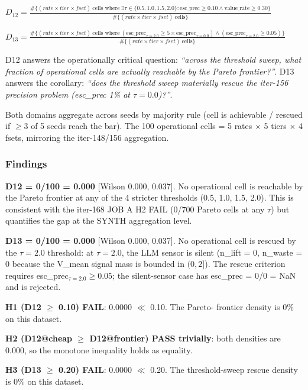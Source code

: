 \documentclass{article}
\begin{document}
  $D_{12} = \frac{\#\{(rate \times tier \times fset)\ \text{cells where}\ \exists \tau \in \{0.5, 1.0, 1.5, 2.0\} : \text{esc\_prec} \geq 0.10 \wedge \text{value\_rate} \geq 0.30\}}{\#\{(rate \times tier \times fset)\ \text{cells}\}}$

  $D_{13} = \frac{\#\{(rate \times tier \times fset)\ \text{cells where}\ (\text{esc\_prec}_{\tau=2.0} \geq 5 \times \text{esc\_prec}_{\tau=0.0}) \wedge (\text{esc\_prec}_{\tau=2.0} \geq 0.05)\}}{\#\{(rate \times tier \times fset)\ \text{cells}\}}$

D12 answers the operationally critical question: \emph{``across the
threshold sweep, what fraction of operational cells are actually
reachable by the Pareto frontier?''}. D13 answers the corollary:
\emph{``does the threshold sweep materially rescue the iter-156
precision problem (esc\_prec 1\% at $\tau=0.0$)?''}.

Both domains aggregate across seeds by majority rule (cell is
achievable / rescued if $\geq 3$ of 5 seeds reach the bar). The 100
operational cells = 5 rates $\times$ 5 tiers $\times$ 4 fsets,
mirroring the iter-148/156 aggregation.

\subsubsection{Findings}
\textbf{D12 = 0/100 = 0.000} [Wilson 0.000, 0.037]. No operational
cell is reachable by the Pareto frontier at any of the 4 stricter
thresholds (0.5, 1.0, 1.5, 2.0). This is consistent with the
iter-168 JOB A H2 FAIL (0/700 Pareto cells at any $\tau$) but
quantifies the gap at the SYNTH aggregation level.

\textbf{D13 = 0/100 = 0.000} [Wilson 0.000, 0.037]. No operational
cell is rescued by the $\tau=2.0$ threshold: at $\tau=2.0$, the LLM
sensor is silent (n\_lift = 0, n\_waste = 0 because the V\_mean
signal mass is bounded in $(0, 2]$). The rescue criterion requires
esc\_prec$_{\tau=2.0} \geq 0.05$; the silent-sensor case has
esc\_prec = 0/0 = NaN and is rejected.

\textbf{H1 (D12 $\geq$ 0.10) FAIL}: 0.0000 $\ll$ 0.10. The Pareto-
frontier density is 0\% on this dataset.

\textbf{H2 (D12@cheap $\geq$ D12@frontier) PASS trivially}: both
densities are 0.000, so the monotone inequality holds as equality.

\textbf{H3 (D13 $\geq$ 0.20) FAIL}: 0.0000 $\ll$ 0.20. The
threshold-sweep rescue density is 0\% on this dataset.
\end{document}
